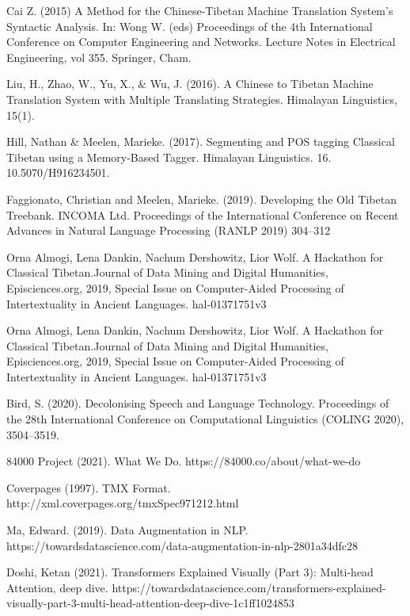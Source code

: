 \documentclass[letterpaper, 12 pt, conference]{ieeeconf}  %
\begin{document}
\begin{thebibliography}{99}



 Cai Z. (2015) A Method for the Chinese-Tibetan Machine Translation System’s Syntactic Analysis. In: Wong W. (eds) Proceedings of the 4th International Conference on Computer Engineering and Networks. Lecture Notes in Electrical Engineering, vol 355. Springer, Cham. 

 Liu, H., Zhao, W., Yu, X., & Wu, J. (2016). A Chinese to Tibetan Machine Translation System with Multiple Translating Strategies. Himalayan Linguistics, 15(1).

 Hill, Nathan & Meelen, Marieke. (2017). Segmenting and POS tagging Classical Tibetan using a Memory-Based Tagger. Himalayan Linguistics. 16. 10.5070/H916234501. 

 Faggionato, Christian  and Meelen, Marieke. (2019). Developing the Old Tibetan Treebank. INCOMA Ltd. Proceedings of the International Conference on Recent Advances in Natural Language Processing (RANLP 2019) 304--312


 Orna Almogi, Lena Dankin, Nachum Dershowitz, Lior Wolf. A Hackathon for Classical Tibetan.Journal of Data Mining and Digital Humanities, Episciences.org, 2019, Special Issue on Computer-Aided Processing of Intertextuality in Ancient Languages. hal-01371751v3

 Orna Almogi, Lena Dankin, Nachum Dershowitz, Lior Wolf. A Hackathon for Classical Tibetan.Journal of Data Mining and Digital Humanities, Episciences.org, 2019, Special Issue on Computer-Aided Processing of Intertextuality in Ancient Languages. hal-01371751v3


 Bird, S. (2020). Decolonising Speech and Language Technology. Proceedings of the 28th International Conference on Computational Linguistics (COLING 2020), 3504–3519.


 84000 Project (2021). What We Do. https://84000.co/about/what-we-do


 Coverpages (1997). TMX Format. http://xml.coverpages.org/tmxSpec971212.html

 Ma, Edward. (2019). Data Augmentation in NLP. https://towardsdatascience.com/data-augmentation-in-nlp-2801a34dfc28

 Doshi, Ketan (2021). Transformers Explained Visually (Part 3): Multi-head Attention, deep dive. https://towardsdatascience.com/transformers-explained-visually-part-3-multi-head-attention-deep-dive-1c1ff1024853


\end{thebibliography}
\end{document}
